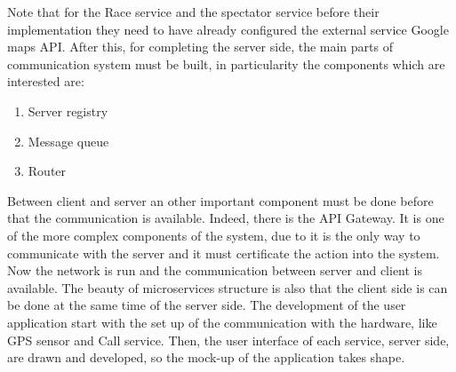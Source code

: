 Note that for the Race service and the spectator service before their implementation they need to have already configured the external service Google maps API. After this, for completing the server side, the main parts of communication system must be built, in particularity the components which are interested are: 
\begin{enumerate}
\item Server registry
\item Message queue
\item Router
\end{enumerate}
Between client and server an other important component must be done before that the communication is available. Indeed, there is the API Gateway. It is one of the more complex components of the system, due to it is the only way to communicate with the server and it must certificate the action into the system. 
Now the network is run and the communication between server and client is available.
The beauty of microservices structure is also that the client side is can be done at the same time of the server side. The development of the user application start with the set up of the communication with the hardware, like GPS sensor and Call service. Then, the user interface of each service, server side, are drawn and developed, so the mock-up of the application takes shape. 